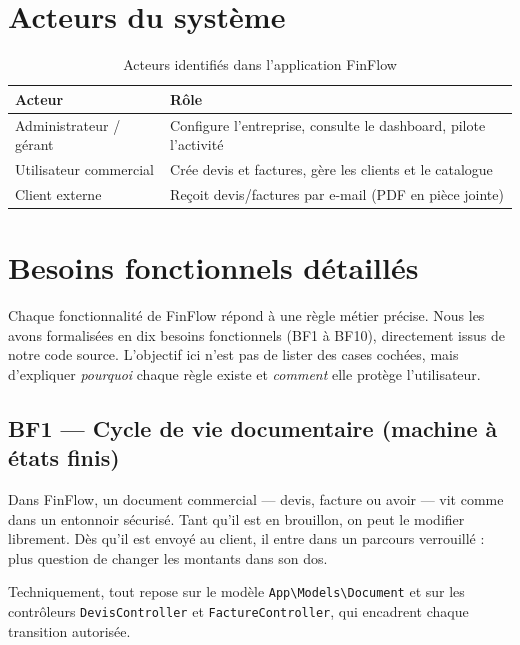 \documentclass[12pt,a4paper]{report}
\begin{document}
\section{Acteurs du système}

\begin{table}[H]
\centering
\caption{Acteurs identifiés dans l'application FinFlow}
\begin{tabular}{@{}ll@{}}
\toprule
\textbf{Acteur} & \textbf{Rôle} \\
\midrule
Administrateur / gérant & Configure l'entreprise, consulte le dashboard, pilote l'activité \\
Utilisateur commercial & Crée devis et factures, gère les clients et le catalogue \\
Client externe & Reçoit devis/factures par e-mail (PDF en pièce jointe) \\
\bottomrule
\end{tabular}
\end{table}

\section{Besoins fonctionnels détaillés}

Chaque fonctionnalité de FinFlow répond à une règle métier précise. Nous les avons formalisées en dix besoins fonctionnels (BF1 à BF10), directement issus de notre code source. L'objectif ici n'est pas de lister des cases cochées, mais d'expliquer \emph{pourquoi} chaque règle existe et \emph{comment} elle protège l'utilisateur.

\subsection{BF1 — Cycle de vie documentaire (machine à états finis)}

Dans FinFlow, un document commercial --- devis, facture ou avoir --- vit comme dans un entonnoir sécurisé. Tant qu'il est en brouillon, on peut le modifier librement. Dès qu'il est envoyé au client, il entre dans un parcours verrouillé : plus question de changer les montants dans son dos.

Techniquement, tout repose sur le modèle \texttt{App\textbackslash Models\textbackslash Document} et sur les contrôleurs \texttt{DevisController} et \texttt{FactureController}, qui encadrent chaque transition autorisée.
\end{document}
